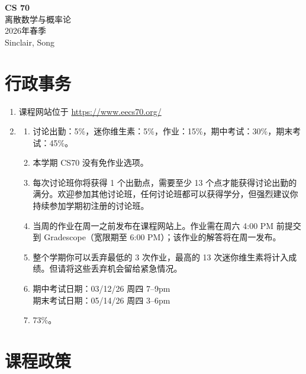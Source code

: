\documentclass[11pt,a4paper]{article}
\begin{document}
\begin{center}
    {\Large\bfseries CS 70}\\[0.3em]
    {\large 离散数学与概率论}\\[0.2em]
    2026年春季\\[0.2em]
    Sinclair, Song\\[1em]
\end{center}

\section{行政事务}

\begin{enumerate}[label=(\alph*)]
    \item 课程网站位于 \url{https://www.eecs70.org/}
    
    \item 
    \begin{solutionbox}
        \begin{enumerate}[label=(\roman*)]
            \item 讨论出勤：5\%，迷你维生素：5\%，作业：15\%，期中考试：30\%，期末考试：45\%。
            \item 本学期 CS70 没有免作业选项。
            \item 每次讨论班你将获得 1 个出勤点，需要至少 13 个点才能获得讨论出勤的满分。欢迎参加其他讨论班，任何讨论班都可以获得学分，但强烈建议你持续参加学期初注册的讨论班。
            \item 当周的作业在周一之前发布在课程网站上。作业需在周六 4:00 PM 前提交到 Gradescope（宽限期至 6:00 PM）；该作业的解答将在周一发布。
            \item 整个学期你可以丢弃最低的 3 次作业，最高的 13 次迷你维生素将计入成绩。但请将这些丢弃机会留给紧急情况。
            \item 期中考试日期：03/12/26 周四 7--9pm\\
                  期末考试日期：05/14/26 周四 3--6pm
            \item 73\%。
        \end{enumerate}
    \end{solutionbox}
\end{enumerate}

\section{课程政策}
\end{document}
